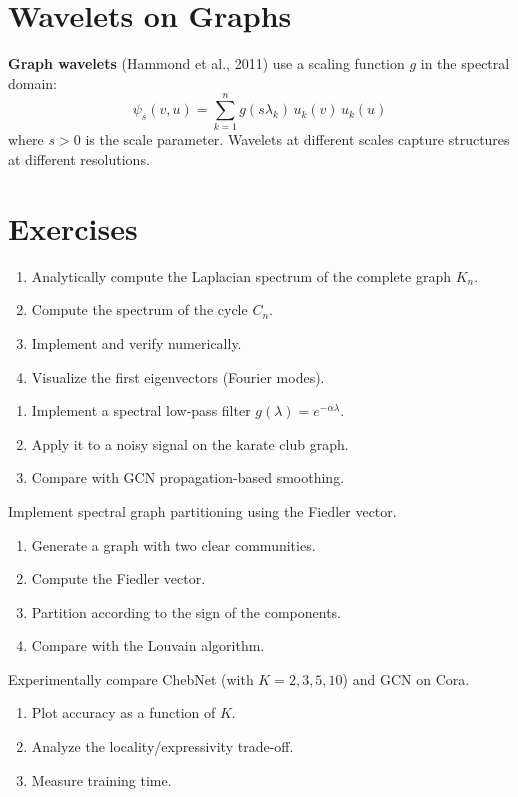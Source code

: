 \section{Wavelets on Graphs}

\begin{definition}
\textbf{Graph wavelets} (Hammond et al., 2011) use a scaling function $g$
in the spectral domain:
\[
    \psi_s(v, u) = \sum_{k=1}^{n} g(s\lambda_k)\, u_k(v)\, u_k(u)
\]
where $s > 0$ is the scale parameter. Wavelets at different scales capture
structures at different resolutions.
\end{definition}

\section*{Exercises}

\begin{exercise}
\begin{enumerate}
    \item Analytically compute the Laplacian spectrum of the complete graph $K_n$.
    \item Compute the spectrum of the cycle $C_n$.
    \item Implement and verify numerically.
    \item Visualize the first eigenvectors (Fourier modes).
\end{enumerate}
\end{exercise}

\begin{exercise}
\begin{enumerate}
    \item Implement a spectral low-pass filter $g(\lambda) = e^{-\alpha\lambda}$.
    \item Apply it to a noisy signal on the karate club graph.
    \item Compare with GCN propagation-based smoothing.
\end{enumerate}
\end{exercise}

\begin{exercise}
Implement spectral graph partitioning using the Fiedler vector.
\begin{enumerate}
    \item Generate a graph with two clear communities.
    \item Compute the Fiedler vector.
    \item Partition according to the sign of the components.
    \item Compare with the Louvain algorithm.
\end{enumerate}
\end{exercise}

\begin{exercise}
Experimentally compare ChebNet (with $K = 2, 3, 5, 10$) and GCN on Cora.
\begin{enumerate}
    \item Plot accuracy as a function of $K$.
    \item Analyze the locality/expressivity trade-off.
    \item Measure training time.
\end{enumerate}
\end{exercise}
